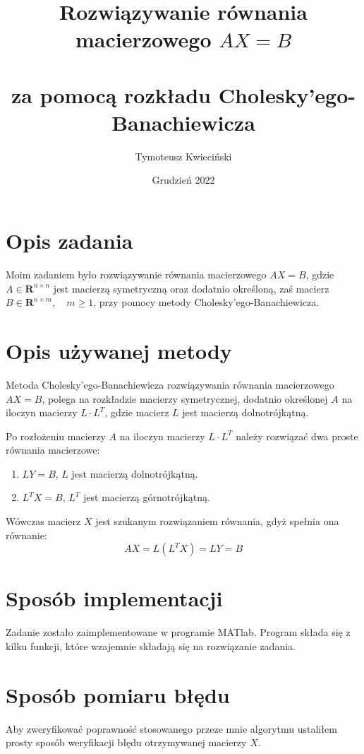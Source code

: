 \documentclass{article}
\title{%
\big Rozwiązywanie równania \\ macierzowego $AX=B$ \\
\large\\ za pomocą rozkładu Cholesky'ego-Banachiewicza}
\author{Tymoteusz Kwieciński}
\date{Grudzień 2022}
\begin{document}
\maketitle

\tableofcontents
\newpage

\section{Opis zadania}

Moim zadaniem było rozwiązywanie równania macierzowego $AX = B$, gdzie $A \in \mathbf{R}^{n \times n}$ jest macierzą symetryczną oraz dodatnio określoną, zaś macierz $B \in \mathbf{R}^{n \times m}, \quad m \geq 1$, przy pomocy metody Cholesky'ego-Banachiewicza. 


\section{Opis używanej metody}


Metoda Cholesky'ego-Banachiewicza rozwiązywania równania macierzowego $AX = B$, polega na rozkładzie macierzy symetrycznej, dodatnio określonej $A$ na iloczyn macierzy $L \cdot L^T$, gdzie macierz $L$ jest macierzą dolnotrójkątną.

Po rozłożeniu macierzy $A$ na iloczyn macierzy $L \cdot L^T$ należy rozwiązać dwa proste równania macierzowe:

\begin{enumerate}
    \item $LY = B$, $L$ jest macierzą dolnotrójkątną.
    \item $L^TX = B$, $L^T$ jest macierzą górnotrójkątną.
\end{enumerate}

Wówczas macierz $X$ jest szukanym rozwiązaniem równania, gdyż spełnia ona równanie:
$$ AX = L (L^T X) = L Y = B$$



\section{Sposób implementacji}

Zadanie zostało zaimplementowane w programie MATlab. 
Program składa się z kilku funkcji, które wzajemnie składają się na rozwiązanie zadania.


\section{Sposób pomiaru błędu}
Aby zweryfikować poprawność stosowanego przeze mnie algorytmu ustaliłem prosty sposób weryfikacji błędu otrzymywanej macierzy $X$. 
\end{document}
